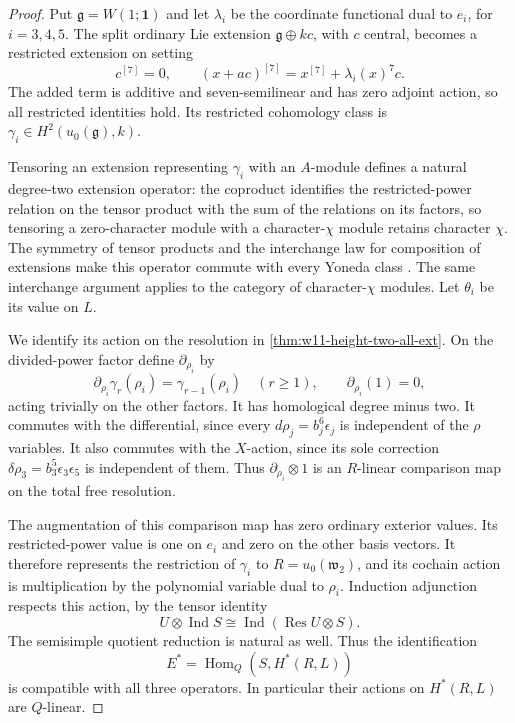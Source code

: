 \documentclass[11pt,reqno]{amsart}
\theoremstyle{definition}
\theoremstyle{remark}
\theoremstyle{definition}
\newcommand{\Hom}{\operatorname{Hom}}
\begin{document}
\begin{proof}
Put $\mathfrak g=W(1;\mathbf1)$ and let $\lambda_i$ be the coordinate
functional dual to $e_i$, for $i=3,4,5$. The split ordinary Lie
extension $\mathfrak g\oplus kc$, with $c$ central, becomes a
restricted extension on setting
\[
 c^{[7]}=0,\qquad
 (x+ac)^{[7]}=x^{[7]}+\lambda_i(x)^7c.
\]
The added term is additive and seven-semilinear and has zero adjoint
action, so all restricted identities hold. Its restricted
cohomology class is $\gamma_i\in H^2(u_0(\mathfrak g),k)$.

Tensoring an extension representing $\gamma_i$ with an $A$-module
defines a natural degree-two extension operator: the coproduct
identifies the restricted-power relation on the tensor product with
the sum of the relations on its factors, so tensoring a zero-character
module with a character-$\chi$ module retains character $\chi$.
The symmetry of tensor products and the interchange law for
composition of extensions make this operator commute with every
Yoneda class \cite[Section 9.3]{Witherspoon2019}.
The same interchange argument applies to the category of
character-$\chi$ modules.
Let $\theta_i$ be its value on $L$.

We identify its action on the resolution in
\cref{thm:w11-height-two-all-ext}. On the divided-power factor define
$\partial_{\rho_i}$ by
\[
 \partial_{\rho_i}\gamma_r(\rho_i)=\gamma_{r-1}(\rho_i)
 \quad(r\ge1),\qquad \partial_{\rho_i}(1)=0,
\]
acting trivially on the other factors. It has homological degree
minus two. It commutes with the differential, since every
$d\rho_j=b_j^6\epsilon_j$ is independent of the $\rho$ variables.
It also commutes with the $X$-action, since its sole correction
$\delta\rho_3=b_3^5\epsilon_3\epsilon_5$ is independent of them.
Thus $\partial_{\rho_i}\otimes1$ is an $R$-linear comparison map
on the total free resolution.

The augmentation of this comparison map has zero ordinary
exterior values. Its restricted-power value is one on $e_i$ and zero
on the other basis vectors. It therefore represents the restriction
of $\gamma_i$ to $R=u_0(\mathfrak w_2)$, and its cochain action is
multiplication by the polynomial variable dual to $\rho_i$.
Induction adjunction respects this action, by the tensor identity
\[
 U\otimes\operatorname{Ind} S
 \cong\operatorname{Ind}(\operatorname{Res}U\otimes S).
\]
The semisimple quotient reduction is natural as well. Thus the
identification
\[
 E^*=\Hom_Q(S,H^*(R,L))
\]
is compatible with all three operators. In particular their actions
on $H^*(R,L)$ are $Q$-linear.


\end{proof}
\end{document}
